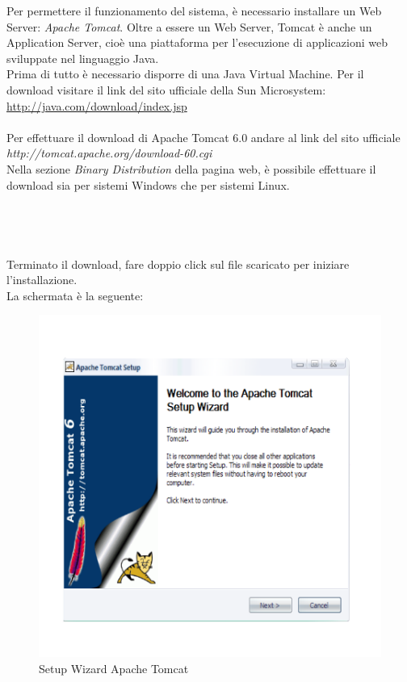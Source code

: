 Per permettere il funzionamento del sistema, \`e necessario installare un Web Server: \textit{Apache Tomcat}. Oltre a essere un Web Server, Tomcat \`e anche un
Application Server, cio\`e una piattaforma per l'esecuzione di applicazioni web sviluppate nel linguaggio Java.\\
Prima di tutto \`e necessario disporre di una Java Virtual Machine. Per il download visitare il link del sito ufficiale della Sun Microsystem:\\
\href{http://java.com/download/index.jsp}{http://java.com/download/index.jsp}\\
\\
Per effettuare il download di Apache Tomcat 6.0 andare al link del sito ufficiale \textit{http://tomcat.apache.org/download-60.cgi}\\
Nella sezione \textit{Binary Distribution} della pagina web, \`e possibile effettuare il download sia per sistemi Windows che per sistemi Linux.\\
\\\\
\\
\\
Terminato il download, fare doppio click sul file scaricato per iniziare l'installazione.\\
La schermata \`e la seguente:
 
\begin{figure}[!ht]
\centering
\includegraphics[scale=0.7]{images/InstallTomcat1.png}
\caption{Setup Wizard Apache Tomcat}

\end{figure} 


